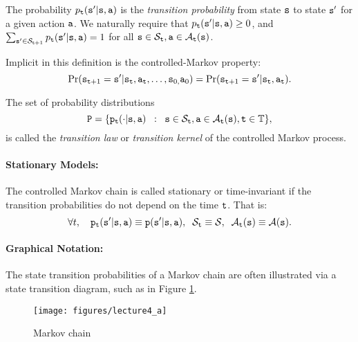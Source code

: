 The probability ${p_{\tt t}}({\tt s}'|{\tt s},{\tt a})$ is the \emph{transition probability} from state ${\tt s}$ to state ${\tt s}'$ for a given action ${\tt a}$. We naturally require that
            ${p_{\tt t}}({\tt s}'|{\tt s},{\tt a}) \ge 0$, and $\sum\nolimits_{{\tt s}' \in {\mathcal{S}_{{\tt t}+ 1}}}^{} {{p_{\tt t}}({\tt s}'|{\tt s},{\tt a})}  = 1$ for all ${\tt s} \in {\mathcal{S}_{\tt t}},{\tt a} \in {\mathcal{A}_{\tt t}}({\tt s})$.

Implicit in this definition is the controlled-Markov property:
\[
\Pr({{\tt s}_{{\tt t} + 1}} =
{\tt s}'|{{\tt s}_{\tt t}},{{\tt a}_{\tt t}}, \ldots
,{{\tt s}_{0,}}{{\tt a}_0}) =\Pr({{\tt s}_{{\tt t} + 1}} =
{\tt s}'|{{\tt s}_{\tt t}},{{\tt a}_{\tt t}}).
\]

The set of probability distributions
                                \[{\tt P} = \{ {{\tt p}_{\tt t}}( \cdot |{\tt s},{\tt a})\;\;:\;\;{\tt s} \in {\mathcal{S}_{\tt t}},{\tt a} \in {\mathcal{A}_{\tt t}}({\tt s}),{\tt t} \in {\ensuremath{\mathbb{T}}}\}, \]
is called the \emph{transition law} or \emph{transition kernel} of the controlled Markov process.

\paragraph{Stationary Models:}
    The controlled Markov chain is called stationary or time-invariant if the transition probabilities do not depend on the time ${\tt t}$. That is:
                     \[\forall t,\quad {{\tt p}_{\tt t}}({\tt s}'|{\tt s},{\tt a}) \equiv {\tt p}({\tt s}'|{\tt s},{\tt a}),\;\;{\mathcal{S}_{\tt t}} \equiv \mathcal{S},\;\;{\mathcal{A}_{\tt t}}({\tt s}) \equiv \mathcal{A}({\tt s}).\]

\paragraph{Graphical Notation:}
The state transition probabilities of a Markov chain are often illustrated via a state transition diagram, such as in Figure \ref{fig:MC}.

\begin{figure}
  \begin{centering}
  \texttt{[image: figures/lecture4\_a]}\\
  \caption{Markov chain}\label{fig:MC}
  \end{centering}
\end{figure}

